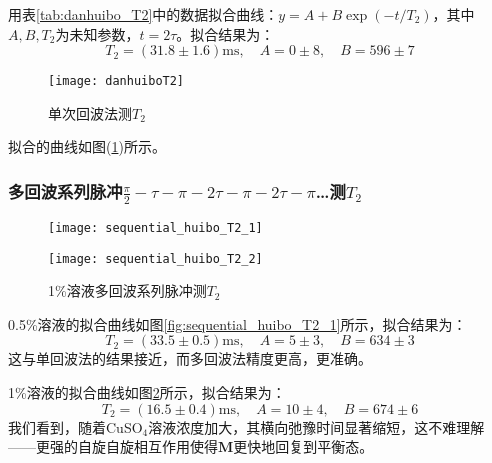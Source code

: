 \documentclass[aps,pre,12pt,preprint,onecolumn,showpacs,showkeys]{revtex4-1}
\begin{document}
        用表\ref{tab:danhuibo_T2}中的数据拟合曲线：$y=A+B\exp(-t/T_2)$，其中$A,B,T_2$为未知参数，$t=2\tau$。拟合结果为：
        \begin{equation}
            T_2=(31.8\pm1.6)\mathrm{ms},\quad A=0\pm 8, \quad B=596\pm7
        \end{equation}
        \begin{figure}[ht]
            \centering
            \texttt{[image: danhuiboT2]}
            \caption{\label{fig:danhuibo_T2}%
            单次回波法测$T_2$}
        \end{figure}
        拟合的曲线如图(\ref{fig:danhuibo_T2})所示。

        \subsubsection{多回波系列脉冲$\frac{\pi}{2}-\tau-\pi-2\tau-\pi-2\tau-\pi$…测$T_2$}

        \begin{figure}[ht]
            \begin{minipage}{.6\textwidth}
                \centering
                \texttt{[image: sequential\_huibo\_T2\_1]}
                \caption{\label{fig:sequential_huibo_T2_1}%
                0.5\%溶液多回波系列脉冲测$T_2$}
            \end{minipage}%
            \begin{minipage}{0.4\textwidth}
                \centering
                \texttt{[image: sequential\_huibo\_T2\_2]}
                \caption{\label{fig:sequential_huibo_T2_2}%
                1\%溶液多回波系列脉冲测$T_2$}
            \end{minipage}
        \end{figure}

        0.5\%溶液的拟合曲线如图\ref{fig:sequential_huibo_T2_1}所示，拟合结果为：
        \begin{equation}
            T_2=(33.5\pm0.5)\mathrm{ms},\quad A=5\pm 3, \quad B=634\pm3
        \end{equation}
        这与单回波法的结果接近，而多回波法精度更高，更准确。

        1\%溶液的拟合曲线如图\ref{fig:sequential_huibo_T2_2}所示，拟合结果为：
        \begin{equation}
            T_2=(16.5\pm 0.4)\mathrm{ms},\quad A=10\pm 4, \quad B=674\pm6
        \end{equation}
        我们看到，随着CuSO$_4$溶液浓度加大，其横向弛豫时间显著缩短，这不难理解——更强的自旋自旋相互作用使得$\bm M$更快地回复到平衡态。
\end{document}

